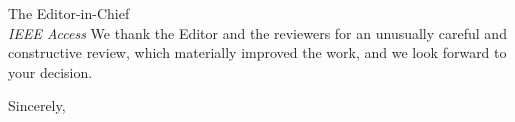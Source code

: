 \documentclass[11pt]{letter}
\begin{document}
\begin{letter}{The Editor-in-Chief\\\textit{IEEE Access}}
We thank the Editor and the reviewers for an unusually careful and constructive
review, which materially improved the work, and we look forward to your decision.

\closing{Sincerely,}

\end{letter}
\end{document}
